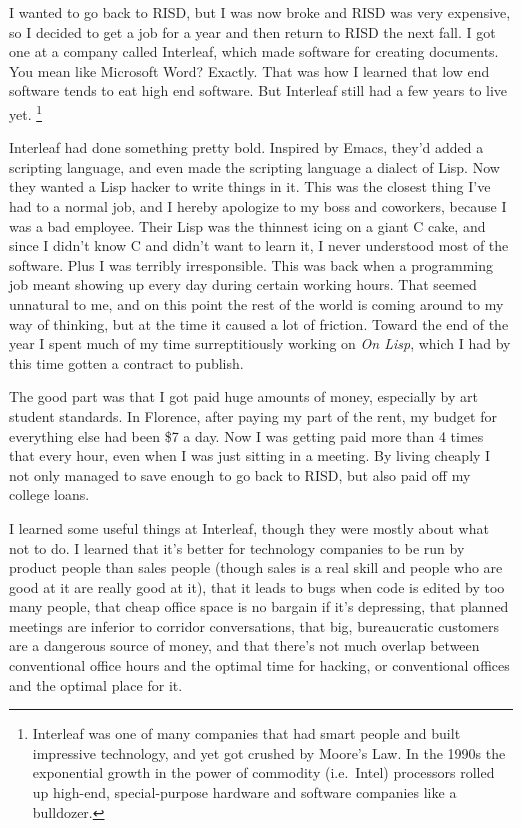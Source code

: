 I wanted to go back to RISD, but I was now broke and RISD was very
expensive, so I decided to get a job for a year and then return to RISD
the next fall. I got one at a company called Interleaf, which made
software for creating documents. You mean like Microsoft Word? Exactly.
That was how I learned that low end software tends to eat high end
software. But Interleaf still had a few years to live yet.
\footnote{Interleaf was one of many companies that had smart people and
built impressive technology, and yet got crushed by Moore's Law. In the
1990s the exponential growth in the power of commodity (i.e.~Intel)
processors rolled up high-end, special-purpose hardware and software
companies like a bulldozer.}

Interleaf had done something pretty bold. Inspired by Emacs, they'd
added a scripting language, and even made the scripting language a
dialect of Lisp. Now they wanted a Lisp hacker to write things in it.
This was the closest thing I've had to a normal job, and I hereby
apologize to my boss and coworkers, because I was a bad employee. Their
Lisp was the thinnest icing on a giant C cake, and since I didn't know C
and didn't want to learn it, I never understood most of the software.
Plus I was terribly irresponsible. This was back when a programming job
meant showing up every day during certain working hours. That seemed
unnatural to me, and on this point the rest of the world is coming
around to my way of thinking, but at the time it caused a lot of
friction. Toward the end of the year I spent much of my time
surreptitiously working on \emph{On Lisp}, which I had by this time
gotten a contract to publish.

The good part was that I got paid huge amounts of money, especially by
art student standards. In Florence, after paying my part of the rent, my
budget for everything else had been \$7 a day. Now I was getting paid
more than 4 times that every hour, even when I was just sitting in a
meeting. By living cheaply I not only managed to save enough to go back
to RISD, but also paid off my college loans.

I learned some useful things at Interleaf, though they were mostly about
what not to do. I learned that it's better for technology companies to
be run by product people than sales people (though sales is a real skill
and people who are good at it are really good at it), that it leads to
bugs when code is edited by too many people, that cheap office space is
no bargain if it's depressing, that planned meetings are inferior to
corridor conversations, that big, bureaucratic customers are a dangerous
source of money, and that there's not much overlap between conventional
office hours and the optimal time for hacking, or conventional offices
and the optimal place for it.

